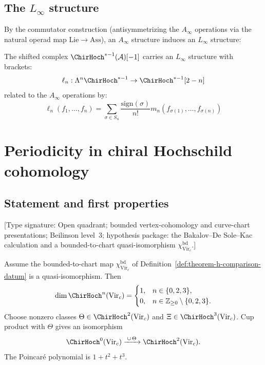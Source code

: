 \subsection{\texorpdfstring{The $L_\infty$ structure}{The L-infinity structure}}

By the commutator construction (antisymmetrizing the $A_\infty$ operations via the natural operad map $\mathrm{Lie} \to \mathrm{Ass}$), an $A_\infty$ structure induces an $L_\infty$ structure:

\begin{theorem}
\label{thm:linfty-chiral-hochschild}
The shifted complex $\ChirHoch^{*-1}(\mathcal{A})[-1]$ carries an $L_\infty$ structure with brackets:
\[
\ell_n: \Lambda^n \ChirHoch^{*-1} \to \ChirHoch^{*-1}[2-n]
\]
related to the $A_\infty$ operations by:
\[
\ell_n(f_1, \ldots, f_n) = \sum_{\sigma \in S_n} \frac{\text{sign}(\sigma)}{n!} m_n(f_{\sigma(1)}, \ldots, f_{\sigma(n)})
\]
\end{theorem}


\section{Periodicity in chiral Hochschild cohomology}

\subsection{Statement and first properties}

\begin{theorem}\label{thm:periodicity-virasoro}
\label{thm:virasoro-periodicity}
\textup{[Type signature: Open quadrant; bounded vertex-cohomology and
curve-chart presentations; Beilinson level~$3$; hypothesis package:
the Bakalov--De Sole--Kac calculation and a bounded-to-chart
quasi-isomorphism $\chi_{\operatorname{Vir}_c}^{\mathrm{bd}}$.]}

Assume the bounded-to-chart map
$\chi_{\operatorname{Vir}_c}^{\mathrm{bd}}$ of
Definition~\ref{def:theorem-h-comparison-datum} is a
quasi-isomorphism.  Then
\[
 \dim\ChirHoch^n(\operatorname{Vir}_c)=
 \begin{cases}
 1,&n\in\{0,2,3\},\\
 0,&n\in\mathbb Z_{\geq0}\setminus\{0,2,3\}.
 \end{cases}
\]
Choose nonzero classes
$\Theta\in\ChirHoch^2(\operatorname{Vir}_c)$ and
$\Xi\in\ChirHoch^3(\operatorname{Vir}_c)$.  Cup product with
$\Theta$ gives an isomorphism
\[
\ChirHoch^0(\mathrm{Vir}_c) \xrightarrow{\;\cup\,\Theta\;}
\ChirHoch^2(\mathrm{Vir}_c).
\]
The Poincar\'e polynomial is $1+t^2+t^3$.
\end{theorem}

